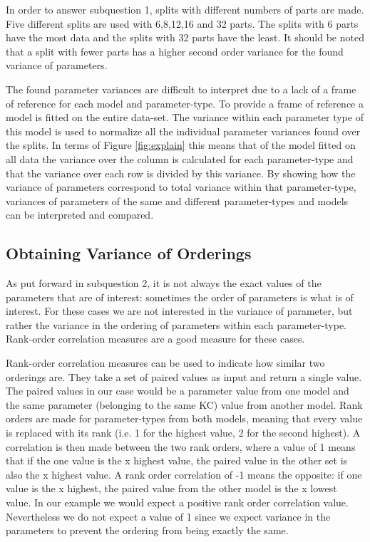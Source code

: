 \documentclass{scrartcl}
\begin{document}
In order to answer subquestion 1, splits with different numbers of parts are made. Five different splits are used with 6,8,12,16 and 32 parts. The splits with 6 parts have the most data and the splits with 32 parts have the least. It should be noted that a split with fewer parts has a higher second order variance for the found variance of parameters.

The found parameter variances are difficult to interpret due to a lack of a frame of reference for each model and parameter-type. To provide a frame of reference a model is fitted on the entire data-set. The variance within each parameter type of this model is used to normalize all the individual parameter variances found over the splits. In terms of Figure \ref{fig:explain} this means that of the model fitted on all data the variance over the column is calculated for each parameter-type and that the variance over each row is divided by this variance. By showing how the variance of parameters correspond to total variance within that parameter-type, variances of parameters of the same and different parameter-types and models can be interpreted and compared.

\subsection{Obtaining Variance of Orderings}
As put forward in subquestion 2, it is not always the exact values of the parameters that are of interest: sometimes the order of parameters is what is of interest. For these cases we are not interested in the variance of parameter, but rather the variance in the ordering of parameters within each parameter-type. Rank-order correlation measures are a good measure for these cases.

Rank-order correlation measures can be used to indicate how similar two orderings are. They take a set of paired values as input and return a single value. The paired values in our case would be a parameter value from one model and the same parameter (belonging to the same KC) value from another model. Rank orders are made for parameter-types from both models, meaning that every value is replaced with its rank (i.e. 1 for the highest value, 2 for the second highest). A correlation is then made between the two rank orders, where a value of 1 means that if the one value is the x highest value, the paired value in the other set is also the x highest value. A rank order correlation of -1 means the opposite: if one value is the x highest, the paired value from the other model is the x lowest value. In our example we would expect a positive rank order correlation value. Nevertheless we do not expect a value of 1 since we expect variance in the parameters to prevent the ordering from being exactly the same. 
\end{document}
